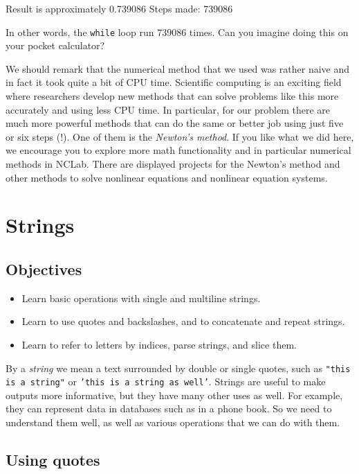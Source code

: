 \begin{greencode}
Result is approximately 0.739086
Steps made: 739086
\end{greencode}
In other words, the {\tt while} loop run 739086 times. Can you 
imagine doing this on your pocket calculator?

We should remark that the numerical method that we used was rather 
naive and in fact it took quite a bit of CPU time. Scientific computing
is an exciting field where researchers develop new methods that 
can solve problems like this more accurately and using less CPU time. 
In particular, for our problem there are much more powerful methods that can do the
same or better job using just five or six steps (!). One of them 
is the {\em Newton's method}. If you like what we did here, we encourage 
you to explore more math functionality and in particular numerical 
methods in NCLab. There are displayed projects for the Newton's method
and other methods to solve nonlinear equations and nonlinear equation systems.


\section{Strings} \label{sec:strings}

\subsection{Objectives}

\begin{itemize}
\item Learn basic operations with single and multiline strings.
\item Learn to use quotes and backslashes, and to concatenate and repeat strings.
\item Learn to refer to letters by indices, parse strings, and slice them.
\end{itemize}
By a {\em string} we mean a text surrounded by double or single quotes, such as 
{\tt "this is a string"} or {\tt 'this is a string as well'}.
Strings are useful to make outputs more informative, but 
they have many other uses as well. For example, they can represent data 
in databases such as in a phone book. So we need to understand them well,
as well as various operations that we can do with them.

\subsection{Using quotes}

